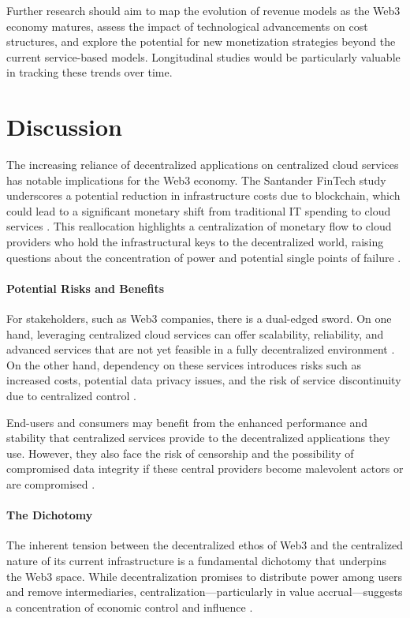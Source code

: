 \documentclass{article}
\begin{document}
Further research should aim to map the evolution of revenue models as the Web3 economy matures, assess the impact of technological advancements on cost structures, and explore the potential for new monetization strategies beyond the current service-based models. Longitudinal studies would be particularly valuable in tracking these trends over time.

\section{Discussion}

The increasing reliance of decentralized applications on centralized cloud services has notable implications for the Web3 economy. The Santander FinTech study underscores a potential reduction in infrastructure costs due to blockchain, which could lead to a significant monetary shift from traditional IT spending to cloud services \cite{pwcblockchain}. This reallocation highlights a centralization of monetary flow to cloud providers who hold the infrastructural keys to the decentralized world, raising questions about the concentration of power and potential single points of failure \cite{tapscott2016blockchain}.

\paragraph{Potential Risks and Benefits} For stakeholders, such as Web3 companies, there is a dual-edged sword. On one hand, leveraging centralized cloud services can offer scalability, reliability, and advanced services that are not yet feasible in a fully decentralized environment \cite{ibmblockchain}. On the other hand, dependency on these services introduces risks such as increased costs, potential data privacy issues, and the risk of service discontinuity due to centralized control \cite{zheng2018blockchain}.

End-users and consumers may benefit from the enhanced performance and stability that centralized services provide to the decentralized applications they use. However, they also face the risk of censorship and the possibility of compromised data integrity if these central providers become malevolent actors or are compromised \cite{mckinseyblockchain}.

\paragraph{The Dichotomy} The inherent tension between the decentralized ethos of Web3 and the centralized nature of its current infrastructure is a fundamental dichotomy that underpins the Web3 space. While decentralization promises to distribute power among users and remove intermediaries, centralization—particularly in value accrual—suggests a concentration of economic control and influence \cite{bismonetary}.
\end{document}
